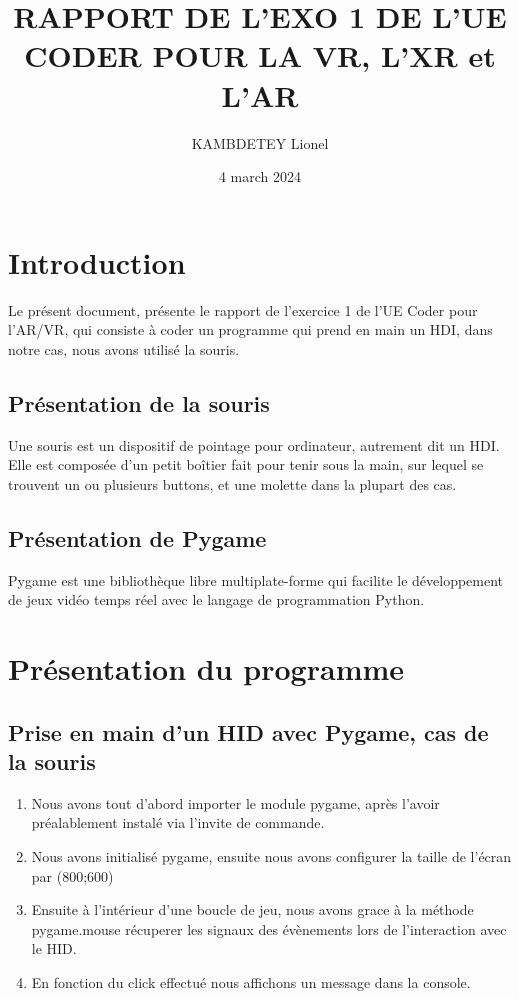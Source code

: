 \documentclass[12pt]{report}
\title{RAPPORT DE L'EXO 1 DE L'UE CODER POUR LA VR, L'XR et L'AR}
\author{KAMBDETEY Lionel}
\date{4 march 2024}
\begin{document}
	\maketitle
	\tableofcontents

	\chapter{Introduction}
	Le présent document, présente le rapport de l'exercice 1 de l'UE Coder pour l'AR/VR, qui consiste à coder un programme qui prend en main un HDI, dans notre cas, nous avons utilisé la souris.
	\section{Présentation de la souris}
	Une souris est un dispositif de pointage pour ordinateur, autrement dit un HDI. Elle est composée d'un petit boîtier fait pour tenir sous la main, sur lequel se trouvent un ou plusieurs buttons, et une molette dans la plupart des cas.
	
	\section{Présentation de Pygame}
	Pygame est une bibliothèque libre multiplate-forme qui facilite le développement de jeux vidéo temps réel avec le langage de programmation Python.
	\chapter{Présentation du programme}
	\section{Prise en main d'un HID avec Pygame, cas de la souris}
	
	\begin{enumerate}
		\item Nous avons tout d'abord importer le module pygame, après l'avoir préalablement instalé via l'invite de commande.
		\item Nous avons initialisé pygame, ensuite nous avons configurer la taille de l'écran par (800;600)
		\item Ensuite à l'intérieur d'une boucle de jeu, nous avons grace à la méthode pygame.mouse récuperer les signaux des évènements lors de l'interaction avec le HID.
		\item  En fonction du click effectué nous affichons un message dans la console.
	\end{enumerate}
	
	
\end{document}
